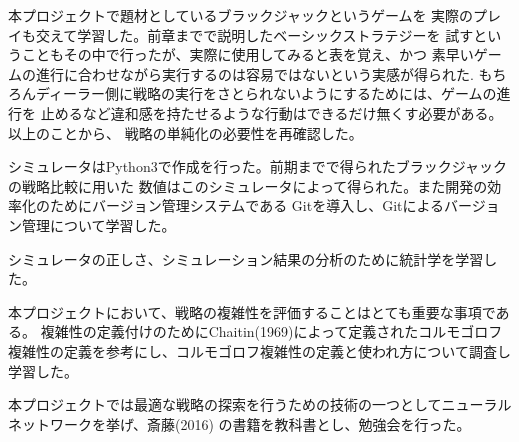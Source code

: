 本プロジェクトで題材としているブラックジャックというゲームを
実際のプレイも交えて学習した。前章までで説明したベーシックストラテジーを
試すということもその中で行ったが、実際に使用してみると表を覚え、かつ
素早いゲームの進行に合わせながら実行するのは容易ではないという実感が得られた.
もちろんディーラー側に戦略の実行をさとられないようにするためには、ゲームの進行を
止めるなど違和感を持たせるような行動はできるだけ無くす必要がある。以上のことから、
戦略の単純化の必要性を再確認した。

シミュレータはPython3で作成を行った。前期までで得られたブラックジャックの戦略比較に用いた
数値はこのシミュレータによって得られた。また開発の効率化のためにバージョン管理システムである
Gitを導入し、Gitによるバージョン管理について学習した。

シミュレータの正しさ、シミュレーション結果の分析のために統計学を学習した。

本プロジェクトにおいて、戦略の複雑性を評価することはとても重要な事項である。
複雑性の定義付けのためにChaitin(1969)によって定義されたコルモゴロフ複雑性の定義を参考にし、コルモゴロフ複雑性の定義と使われ方について調査し学習した。

本プロジェクトでは最適な戦略の探索を行うための技術の一つとしてニューラルネットワークを挙げ、斎藤(2016) の書籍を教科書とし、勉強会を行った。


